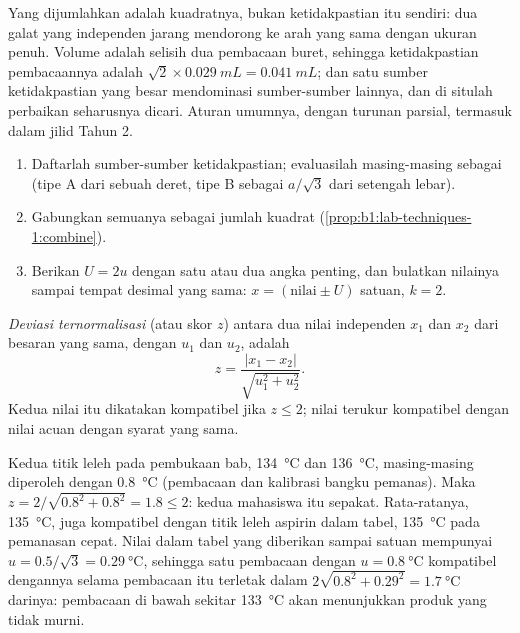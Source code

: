 Yang dijumlahkan adalah kuadratnya, bukan ketidakpastian itu sendiri: dua
galat yang independen jarang mendorong ke arah yang sama dengan ukuran
penuh. Volume  adalah selisih dua pembacaan buret, sehingga
ketidakpastian pembacaannya adalah
$\sqrt2 \times \qty{0.029}{mL} = \qty{0.041}{mL}$; dan satu sumber
ketidakpastian yang besar mendominasi sumber-sumber lainnya, dan di
situlah perbaikan seharusnya dicari. Aturan umumnya, dengan turunan
parsial, termasuk dalam jilid Tahun 2.

\begin{method}\label{met:b1:lab-techniques-1:report-result}
\begin{enumerate}
  \item Daftarlah sumber-sumber ketidakpastian; evaluasilah masing-masing
        sebagai  (tipe A dari sebuah deret, tipe B
        sebagai $a/\sqrt3$ dari setengah lebar).
  \item Gabungkan semuanya sebagai jumlah kuadrat (\cref{prop:b1:lab-techniques-1:combine}).
  \item Berikan  $U = 2u$ dengan satu atau dua
        angka penting, dan bulatkan nilainya sampai tempat desimal yang
        sama: $x = (\text{nilai} \pm U)$ satuan, $k = 2$.
\end{enumerate}
\end{method}

\begin{definition}\label{def:b1:lab-techniques-1:z-score}
\emph{Deviasi ternormalisasi} (atau skor $z$)
antara dua nilai independen $x_1$ dan $x_2$ dari besaran yang sama,
dengan  $u_1$ dan $u_2$, adalah
\[
  z = \frac{|x_1 - x_2|}{\sqrt{u_1^2 + u_2^2}} .
\]
Kedua nilai itu dikatakan kompatibel jika $z \le 2$; nilai terukur
kompatibel dengan nilai acuan dengan syarat yang sama.
\end{definition}

\begin{example}
Kedua titik leleh pada pembukaan bab, \qty{134}{\celsius} dan
\qty{136}{\celsius}, masing-masing diperoleh dengan 
\qty{0.8}{\celsius} (pembacaan dan kalibrasi bangku pemanas). Maka
$z = 2/\sqrt{0.8^2 + 0.8^2} = 1.8 \le 2$: kedua mahasiswa itu sepakat.
Rata-ratanya,
\qty{135}{\celsius}, juga kompatibel dengan titik leleh aspirin dalam
tabel, \qty{135}{\celsius} pada pemanasan cepat. Nilai dalam tabel yang
diberikan sampai satuan mempunyai $u = 0.5/\sqrt3 = \qty{0.29}{\celsius}$, sehingga satu
pembacaan dengan $u = \qty{0.8}{\celsius}$ kompatibel dengannya selama
pembacaan itu terletak dalam
$2\sqrt{0.8^2 + 0.29^2} = \qty{1.7}{\celsius}$ darinya: pembacaan di
bawah sekitar \qty{133}{\celsius} akan menunjukkan produk yang tidak
murni.
\end{example}

